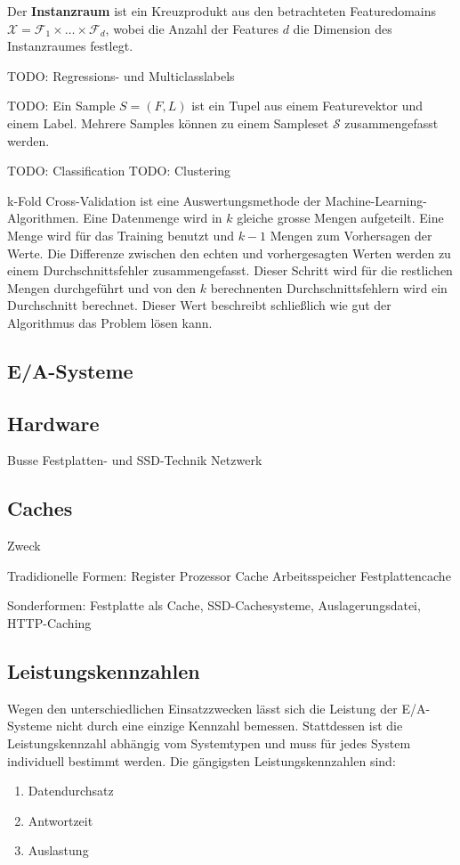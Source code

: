 Der \textbf{Instanzraum} ist ein Kreuzprodukt aus den betrachteten Featuredomains $\mathscr{X} = \mathscr{F}_1 \times \dots \times \mathscr{F}_d$, wobei die Anzahl der Features $d$ die Dimension des Instanzraumes festlegt.

TODO: Regressions- und Multiclasslabels

TODO: Ein Sample $S = (F, L)$ ist ein Tupel aus einem Featurevektor und einem Label. Mehrere Samples können zu einem Sampleset $\mathcal{S}$ zusammengefasst werden.

TODO: Classification
TODO: Clustering

k-Fold Cross-Validation ist eine Auswertungsmethode der Machine-Learning-Algorithmen. Eine Datenmenge wird in $k$ gleiche grosse Mengen aufgeteilt. Eine Menge wird für das Training benutzt und $k-1$ Mengen zum Vorhersagen der Werte. Die Differenze zwischen den echten und vorhergesagten Werten werden zu einem Durchschnittsfehler zusammengefasst. Dieser Schritt wird für die restlichen Mengen durchgeführt und von den $k$ berechnenten Durchschnittsfehlern wird ein Durchschnitt berechnet. Dieser Wert beschreibt schließlich wie gut der Algorithmus das Problem lösen kann.

\subsection{E/A-Systeme}


\subsection{Hardware}
Busse
Festplatten- und SSD-Technik
Netzwerk


\subsection{Caches}
Zweck

Tradidionelle Formen:
Register
Prozessor Cache
Arbeitsspeicher
Festplattencache

Sonderformen: Festplatte als Cache, SSD-Cachesysteme, Auslagerungsdatei, HTTP-Caching


\subsection{Leistungskennzahlen}
Wegen den unterschiedlichen Einsatzzwecken lässt sich die Leistung der E/A-Systeme nicht durch eine einzige Kennzahl bemessen. Stattdessen ist die Leistungskennzahl abhängig vom Systemtypen und muss für jedes System individuell bestimmt werden. Die gängigsten Leistungskennzahlen sind:
\begin{enumerate}
	\item Datendurchsatz
	\item Antwortzeit
	\item Auslastung
\end{enumerate}


